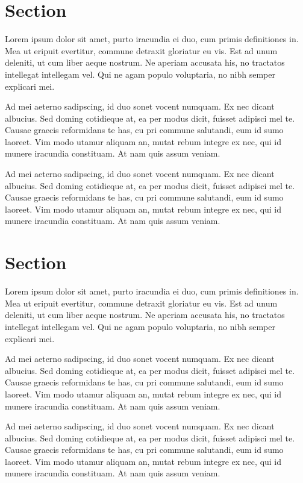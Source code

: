 \documentclass[10pt,a4paper,twocolumn,german]{article}
\begin{document}

\section{Section}

	Lorem ipsum dolor sit amet, purto iracundia ei duo, cum primis definitiones in.
	Mea ut eripuit evertitur, commune detraxit gloriatur eu vis.
	Est ad unum deleniti, ut cum liber aeque nostrum.
	Ne aperiam accusata his, no tractatos intellegat intellegam vel.
	Qui ne agam populo voluptaria, no nibh semper explicari mei.
	
	Ad mei aeterno sadipscing, id duo sonet vocent numquam.
	Ex nec dicant albucius. Sed doming cotidieque at, ea per modus dicit, fuisset adipisci mel te.
	Causae graecis reformidans te has, cu pri commune salutandi, eum id sumo laoreet.
	Vim modo utamur aliquam an, mutat rebum integre ex nec, qui id munere iracundia constituam.
	At nam quis assum veniam.	
	
	Ad mei aeterno sadipscing, id duo sonet vocent numquam.
	Ex nec dicant albucius. Sed doming cotidieque at, ea per modus dicit, fuisset adipisci mel te.
	Causae graecis reformidans te has, cu pri commune salutandi, eum id sumo laoreet.
	Vim modo utamur aliquam an, mutat rebum integre ex nec, qui id munere iracundia constituam.
	At nam quis assum veniam.	
\section{Section}

	Lorem ipsum dolor sit amet, purto iracundia ei duo, cum primis definitiones in.
	Mea ut eripuit evertitur, commune detraxit gloriatur eu vis.
	Est ad unum deleniti, ut cum liber aeque nostrum.
	Ne aperiam accusata his, no tractatos intellegat intellegam vel.
	Qui ne agam populo voluptaria, no nibh semper explicari mei.
	
	Ad mei aeterno sadipscing, id duo sonet vocent numquam.
	Ex nec dicant albucius. Sed doming cotidieque at, ea per modus dicit, fuisset adipisci mel te.
	Causae graecis reformidans te has, cu pri commune salutandi, eum id sumo laoreet.
	Vim modo utamur aliquam an, mutat rebum integre ex nec, qui id munere iracundia constituam.
	At nam quis assum veniam.	
	
	Ad mei aeterno sadipscing, id duo sonet vocent numquam.
	Ex nec dicant albucius. Sed doming cotidieque at, ea per modus dicit, fuisset adipisci mel te.
	Causae graecis reformidans te has, cu pri commune salutandi, eum id sumo laoreet.
	Vim modo utamur aliquam an, mutat rebum integre ex nec, qui id munere iracundia constituam.
	At nam quis assum veniam.	
\end{document}
